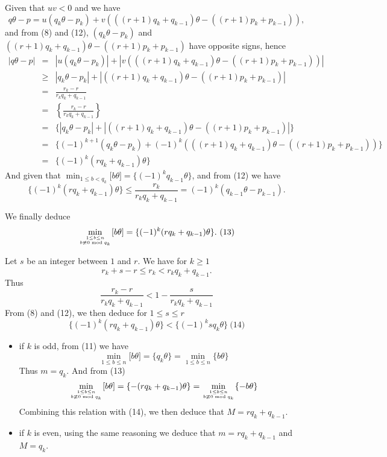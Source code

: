 \documentclass[a4paper,12pt]{article}
\begin{document}
Given that $uv<0$ and we have
\[ q\theta - p = u(q_k\theta - p_k) + v(((r+1)q_k+q_{k-1})\theta -
((r+1)p_k+ p_{k-1})),\]
and from (8) and (12), $(q_k\theta - p_k)$ and $((r+1)q_k+q_{k-1})\theta
- ((r+1)p_k + p_{k-1})$ have opposite signs, hence
\begin{eqnarray*}
  |q\theta - p| &=& |u(q_k\theta - p_k)| + |v(((r+1)q_k + q_{k-1})\theta -
  ((r+1)p_k + p_{k-1}))| \\
  &\ge& |q_k \theta - p_k| + |((r+1)q_k + q_{k-1})\theta - ((r+1)p_k +
  p_{k-1})| \\
  &=& \frac{r_k - r}{r_k q_k + q_{k-1}}\\
  &=& \left\{ \frac{r_k - r}{r_k q_k + q_{k-1}}\right\} \\
  &=& \{ |q_k \theta - p_k| + |((r+1)q_k + q_{k-1})\theta - ((r+1)p_k +
  p_{k-1})| \} \\
  &=& \{ (-1)^{k+1}(q_k\theta - p_k) + (-1)^k (((r+1)q_k +
  q_{k-1})\theta - ((r+1) p_k + p_{k-1}))\} \\
  &=& \{ (-1)^k(rq_k + q_{k-1})\theta\}
\end{eqnarray*}
And given that
$\min_{1\le b<q_k}\lbrack b\theta \rbrack = \{(-1)^{k}q_{k-1}\theta\}$,
and from (12) we have
\[ \{(-1)^k(rq_k + q_{k-1}) \theta\} \le \frac{r_k}{r_kq_k + q_{k-1}} =
(-1)^k (q_{k-1}\theta - p_{k-1}).\]

We finally deduce
\[ \min_{1\le b\le n\atop b \not\equiv 0 \bmod{q_k}}\lbrack
b\theta\rbrack = \{(-1)^k(rq_k + q_{k-1})\theta\}.\ (13)\]

Let $s$ be an integer between $1$ and $r$.  We have for $k\ge 1$
\[ r_k + s - r \le r_k < r_k q_k + q_{k-1}.\]
Thus
\[ \frac{r_k - r}{r_k q_k + q_{k-1}} < 1 - \frac{s}{r_k q_k +
  q_{k-1}}\]
From (8) and (12), we then deduce for $1\le s\le r$
\[ \{(-1)^k(r q_k + q_{k-1})\theta\} <
\{(-1)^ksq_k\theta\}\ \mbox{(14)}\]

\begin{itemize}
\item
  if $k$ is odd, from (11) we have
  \[ \min_{1\le b\le n}\lbrack b\theta \rbrack = \{q_k\theta\} =
  \min_{1\le b\le n}\{ b \theta\}\]
  Thus $m = q_k$.  And from (13)
  \[ \min_{1\le b\le n\atop b \not\equiv 0 \bmod{q_k}}\lbrack
  b\theta\rbrack = \{-(rq_k + q_{k-1})\theta\} = \min_{1\le b\le n\atop
    b \not\equiv 0\bmod{q_k}}\{ -b\theta\}\]
  Combining this relation with (14), we then deduce that $M = rq_k +
  q_{k-1}$.

\item
  if $k$ is even, using the same reasoning we deduce that $m = rq_k +
  q_{k-1}$ and $M = q_k$.
\end{itemize}
\end{document}
